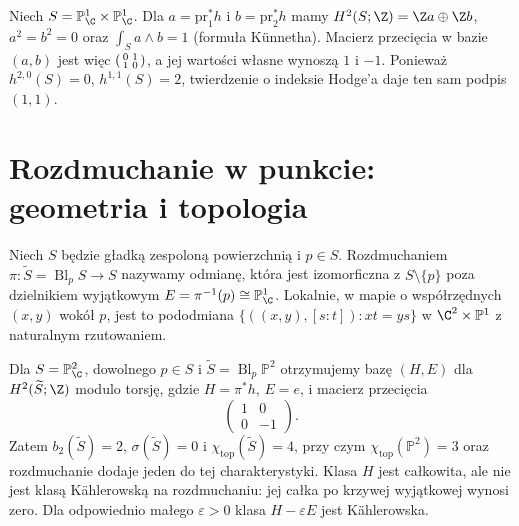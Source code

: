 \begin{przyklad}
Niech $S=\mathbb P^1_\C\times\mathbb P^1_\C$.
Dla $a=\mathrm{pr}_1^*h$ i $b=\mathrm{pr}_2^*h$ mamy
$H^2(S;\Z)=\Z a\oplus\Z b$, $a^2=b^2=0$ oraz
$\int_S a\wedge b=1$ (formuła Künnetha).
Macierz przecięcia w bazie $(a,b)$ jest więc
$\begin{psmallmatrix}0&1\\1&0\end{psmallmatrix}$,
a jej wartości własne wynoszą $1$ i $-1$.
Ponieważ $h^{2,0}(S)=0$, $h^{1,1}(S)=2$,
twierdzenie o indeksie Hodge'a daje ten sam podpis $(1,1)$.
\end{przyklad}

\section{Rozdmuchanie w punkcie: geometria i topologia}
\begin{definicja}
Niech $S$ będzie gładką zespoloną powierzchnią i $p\in S$.
Rozdmuchaniem $\pi:\widetilde S=\operatorname{Bl}_pS\to S$
nazywamy odmianę, która jest izomorficzna z $S\setminus\{p\}$
poza dzielnikiem wyjątkowym $E=\pi^{-1}(p)\cong\mathbb P^1_\C$.
Lokalnie, w mapie o współrzędnych $(x,y)$ wokół $p$, jest to
pododmiana $\{((x,y),[s:t]):xt=ys\}$ w
$\C^2\times\mathbb P^1$ z naturalnym rzutowaniem.
\end{definicja}


\begin{przyklad}
Dla $S=\mathbb P^2_\C$, dowolnego $p\in S$
i $\widetilde S=\operatorname{Bl}_p\mathbb P^2$
otrzymujemy bazę $(H,E)$ dla
$H^2(\widetilde S;\Z)$ modulo torsję,
gdzie $H=\pi^*h$, $E=e$, i macierz przecięcia
\[
\begin{pmatrix}1&0\\0&-1\end{pmatrix}.
\]
Zatem $b_2(\widetilde S)=2$,
$\sigma(\widetilde S)=0$ i
$\chi_{\mathrm{top}}(\widetilde S)=4$,
przy czym $\chi_{\mathrm{top}}(\mathbb P^2)=3$
oraz rozdmuchanie dodaje jeden do tej charakterystyki.
Klasa $H$ jest całkowita, ale nie jest klasą Kählerowską
na rozdmuchaniu: jej całka po krzywej wyjątkowej wynosi zero.
Dla odpowiednio małego $\varepsilon>0$ klasa
$H-\varepsilon E$ jest Kählerowska.
\end{przyklad}

